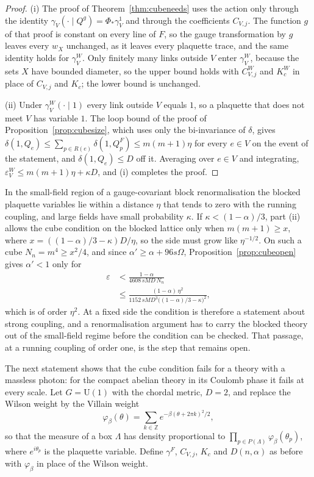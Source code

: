 \documentclass[aps,prd,twocolumn,superscriptaddress,nofootinbib,longbibliography,floatfix,amsmath,amssymb,10pt]{revtex4-2}
\theoremstyle{definition}
\theoremstyle{remark}
\newcommand{\Z}{\mathbb{Z}}
\newcommand{\U}{\mathrm{U}}
\begin{document}
\begin{proof}
(i) The proof of Theorem~\ref{thm:cubeneeds} uses the action only through
the identity $\gamma_V(\cdot\mid Q^g)=\Phi_*\gamma^1_V$ and through the
coefficients $C_{V,j}$. The function $g$ of that proof is constant on every
line of $F$, so the gauge transformation by $g$ leaves every $w_X$
unchanged, as it leaves every plaquette trace, and the same identity holds
for $\gamma^W_V$. Only finitely many links outside $V$ enter $\gamma^W_V$,
because the sets $X$ have bounded diameter, so the upper bound holds with
$C^W_{V,j}$ and $K^W_c$ in place of $C_{V,j}$ and $K_c$; the lower bound is
unchanged.

(ii) Under $\gamma^W_V(\cdot\mid1)$ every link outside $V$ equals $1$, so a
plaquette that does not meet $V$ has variable $1$. The loop bound of the
proof of Proposition~\ref{prop:cubesize}, which uses only the bi-invariance
of $\delta$, gives $\delta(1,Q_e)\le\sum_{p\in R(e)}\delta(1,Q^F_p)\le
m(m+1)\eta$ for every $e\in V$ on the event of the statement, and
$\delta(1,Q_e)\le D$ off it. Averaging over $e\in V$ and integrating,
$\varepsilon^W_V\le m(m+1)\eta+\kappa D$, and (i) completes the proof.
\end{proof}

In the small-field region of a gauge-covariant block renormalisation the
blocked plaquette variables lie within a distance $\eta$ that tends to zero
with the running coupling, and large fields have small probability
$\kappa$. If $\kappa<(1-\alpha)/3$, part (ii) allows the cube condition on
the blocked lattice only when $m(m+1)\ge x$, where
$x=((1-\alpha)/3-\kappa)D/\eta$, so the side must grow like $\eta^{-1/2}$.
On such a cube $N_n=m^4\ge x^2/4$, and since $\alpha'\ge\alpha+96s\Omega$,
Proposition~\ref{prop:cubeopen} gives $\alpha'<1$ only for
\[
\begin{split}
\varepsilon&<\frac{1-\alpha}{4608\,sMD\,N_n}\\
&\le\frac{(1-\alpha)\,\eta^2}{1152\,sMD^3\bigl((1-\alpha)/3-\kappa\bigr)^2},
\end{split}
\]
which is of order $\eta^2$. At a fixed side the condition is therefore a
statement about strong coupling, and a renormalisation argument has to carry
the blocked theory out of the small-field regime before the condition can
be checked. That passage, at a running coupling of order one, is the step
that remains open.

The next statement shows that the cube condition fails for a theory with a
massless photon: for the compact
abelian theory in its Coulomb phase it fails at every scale. Let $G=\U(1)$
with the chordal metric, $D=2$, and replace the Wilson weight by the
Villain weight
\[
\varphi_\beta(\theta)=\sum_{k\in\Z}e^{-\beta(\theta+2\pi k)^2/2},
\]
so that the measure of a box $\Lambda$ has density proportional to
$\prod_{p\in P(\Lambda)}\varphi_\beta(\theta_p)$, where $e^{i\theta_p}$ is
the plaquette variable. Define $\gamma^F$, $C_{V,j}$, $K_c$ and $D(n,\alpha)$
as before with $\varphi_\beta$ in place of the Wilson weight.
\end{document}
